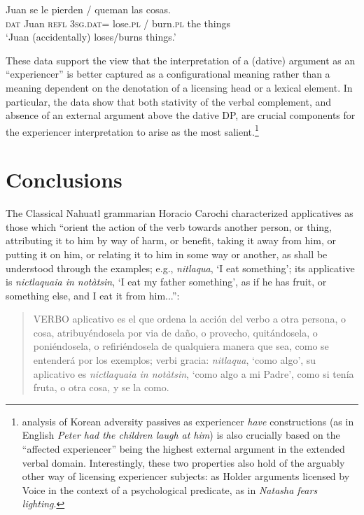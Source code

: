 \documentclass[output=paper,colorlinks,citecolor=brown,modfonts,nonflat]{langsci/langscibook}
\begin{document}
\ea%
    \label{ex:cuervo:22}
     {Juan} {se} {le} {pierden} / {queman} {las} {cosas}.\\
    \textsc{dat} Juan \textsc{refl} \textsc{3sg.dat}= lose.\textsc{pl} / burn.\textsc{pl}  the things\\
    \glt ‘Juan (accidentally) loses/burns things.’
    \z

These data support the view that the interpretation of a (dative) argument as an “experiencer” is better captured as a configurational meaning rather than a meaning dependent on the denotation of a licensing head or a lexical element. In particular, the data show that both stativity of the verbal complement, and absence of an external argument above the dative DP, are crucial components for the experiencer interpretation to arise as the most salient.\footnote{ analysis of Korean adversity passives as experiencer \textit{have} constructions (as in English \textit{Peter had the children laugh at him}) is also crucially based on the “affected experiencer” being the highest external argument in the extended verbal domain. Interestingly, these two properties also hold of the arguably other way of licensing experiencer subjects: as Holder arguments licensed by Voice in the context of a psychological predicate, as in \textit{Natasha fears lighting}.}

\section{Conclusions}\label{sec:cuervo:5}

{The} Classical Nahuatl grammarian Horacio Carochi characterized applicatives as those which “orient the action of the verb towards another person, or thing, attributing it to him by way of harm, or benefit, taking it away from him, or putting it on him, or relating it to him in some way or another, as shall be understood through the examples; e.g., \textit{nitlaqua}, ‘I eat something’; its applicative is \textit{nictlaquaia in notàtsin}, ‘I eat my father something’, as if he has fruit, or something else, and I eat it from him...”:

\begin{quote}
VERBO aplicativo es el que ordena la acción del verbo a otra persona, o cosa, atribuyéndosela por via de daño, o provecho, quitándosela, o poniéndosela, o refiriéndosela de qualquiera manera que sea, como se entenderá por los exemplos; verbi gracia: \textit{nitlaqua}, ‘como algo’, su aplicativo es \textit{nictlaquaia in notàtsin}, ‘como algo a mi Padre’, como si tenía fruta, o otra cosa, y se la como. \citep[466]{Carochi1645}
\end{quote}
\end{document}
